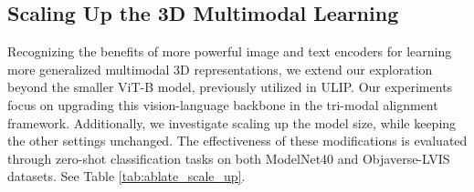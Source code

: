 \documentclass[10pt,twocolumn,letterpaper]{article}
\begin{document}
\subsection{Scaling Up the 3D Multimodal Learning}

Recognizing the benefits of more powerful image and text encoders for learning more generalized multimodal 3D representations, we extend our exploration beyond the smaller ViT-B model, previously utilized in ULIP. Our experiments focus on upgrading this vision-language backbone in the tri-modal alignment framework. Additionally, we investigate scaling up the model size, while keeping the other settings unchanged. The effectiveness of these modifications is evaluated through zero-shot classification tasks on both ModelNet40 and Objaverse-LVIS datasets. See Table \ref{tab:ablate_scale_up}.


\end{document}

